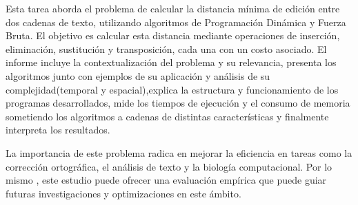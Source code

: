 Esta tarea aborda el problema de calcular la distancia mínima de edición entre dos cadenas de texto, utilizando algoritmos de Programación Dinámica y Fuerza Bruta. El objetivo es calcular esta distancia mediante operaciones de inserción, eliminación, sustitución y transposición, cada una con un costo asociado.
El informe incluye la contextualización del problema y su relevancia, presenta los algoritmos junto con ejemplos de su aplicación y análisis de su complejidad(temporal y espacial),explica la estructura y funcionamiento de los programas desarrollados, mide los tiempos de ejecución y el consumo de memoria sometiendo los algoritmos a cadenas de distintas características y finalmente interpreta los resultados.

La importancia de este problema radica en mejorar la eficiencia en tareas como la corrección ortográfica, el análisis de texto y la biología computacional. Por lo mismo
, este estudio puede ofrecer una evaluación empírica que puede guiar futuras investigaciones y optimizaciones en este ámbito.



